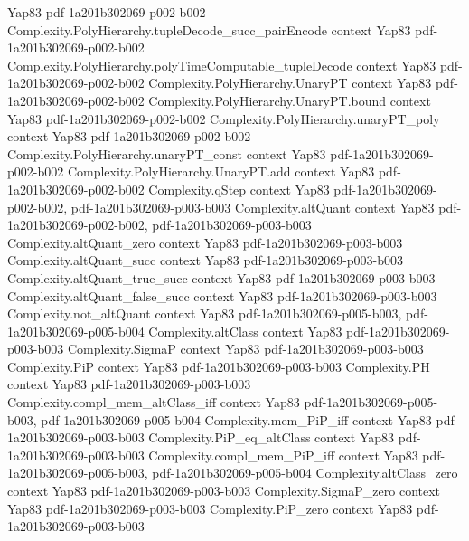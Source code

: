 \begin{theorem}
  {Yap83}
  {pdf-1a201b302069-p002-b002}
\proofstep
  {Complexity.PolyHierarchy.tupleDecode_succ_pairEncode}
  {context}
  {Yap83}
  {pdf-1a201b302069-p002-b002}
\proofstep
  {Complexity.PolyHierarchy.polyTimeComputable_tupleDecode}
  {context}
  {Yap83}
  {pdf-1a201b302069-p002-b002}
\proofstep
  {Complexity.PolyHierarchy.UnaryPT}
  {context}
  {Yap83}
  {pdf-1a201b302069-p002-b002}
\proofstep
  {Complexity.PolyHierarchy.UnaryPT.bound}
  {context}
  {Yap83}
  {pdf-1a201b302069-p002-b002}
\proofstep
  {Complexity.PolyHierarchy.unaryPT_poly}
  {context}
  {Yap83}
  {pdf-1a201b302069-p002-b002}
\proofstep
  {Complexity.PolyHierarchy.unaryPT_const}
  {context}
  {Yap83}
  {pdf-1a201b302069-p002-b002}
\proofstep
  {Complexity.PolyHierarchy.UnaryPT.add}
  {context}
  {Yap83}
  {pdf-1a201b302069-p002-b002}
\proofstep
  {Complexity.qStep}
  {context}
  {Yap83}
  {pdf-1a201b302069-p002-b002,
    pdf-1a201b302069-p003-b003}
\proofstep
  {Complexity.altQuant}
  {context}
  {Yap83}
  {pdf-1a201b302069-p002-b002,
    pdf-1a201b302069-p003-b003}
\proofstep
  {Complexity.altQuant_zero}
  {context}
  {Yap83}
  {pdf-1a201b302069-p003-b003}
\proofstep
  {Complexity.altQuant_succ}
  {context}
  {Yap83}
  {pdf-1a201b302069-p003-b003}
\proofstep
  {Complexity.altQuant_true_succ}
  {context}
  {Yap83}
  {pdf-1a201b302069-p003-b003}
\proofstep
  {Complexity.altQuant_false_succ}
  {context}
  {Yap83}
  {pdf-1a201b302069-p003-b003}
\proofstep
  {Complexity.not_altQuant}
  {context}
  {Yap83}
  {pdf-1a201b302069-p005-b003,
    pdf-1a201b302069-p005-b004}
\proofstep
  {Complexity.altClass}
  {context}
  {Yap83}
  {pdf-1a201b302069-p003-b003}
\proofstep
  {Complexity.SigmaP}
  {context}
  {Yap83}
  {pdf-1a201b302069-p003-b003}
\proofstep
  {Complexity.PiP}
  {context}
  {Yap83}
  {pdf-1a201b302069-p003-b003}
\proofstep
  {Complexity.PH}
  {context}
  {Yap83}
  {pdf-1a201b302069-p003-b003}
\proofstep
  {Complexity.compl_mem_altClass_iff}
  {context}
  {Yap83}
  {pdf-1a201b302069-p005-b003,
    pdf-1a201b302069-p005-b004}
\proofstep
  {Complexity.mem_PiP_iff}
  {context}
  {Yap83}
  {pdf-1a201b302069-p003-b003}
\proofstep
  {Complexity.PiP_eq_altClass}
  {context}
  {Yap83}
  {pdf-1a201b302069-p003-b003}
\proofstep
  {Complexity.compl_mem_PiP_iff}
  {context}
  {Yap83}
  {pdf-1a201b302069-p005-b003,
    pdf-1a201b302069-p005-b004}
\proofstep
  {Complexity.altClass_zero}
  {context}
  {Yap83}
  {pdf-1a201b302069-p003-b003}
\proofstep
  {Complexity.SigmaP_zero}
  {context}
  {Yap83}
  {pdf-1a201b302069-p003-b003}
\proofstep
  {Complexity.PiP_zero}
  {context}
  {Yap83}
  {pdf-1a201b302069-p003-b003}

\end{theorem}
